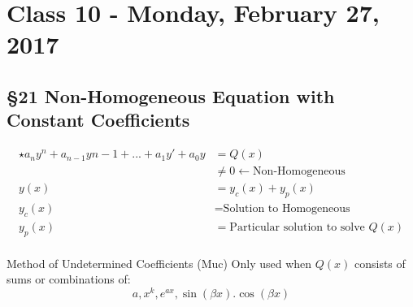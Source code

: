 \chapter{Class 10 - Monday, February 27, 2017}
\section*{\S 21 Non-Homogeneous Equation with Constant Coefficients}
\begin{align*}
    \star a_n y^n+a_{n-1}y{n-1}+\text{...}+a_1y'+a_0 y&=Q(x)\\
    &\neq 0 \leftarrow \text{Non-Homogeneous}\\
    y(x)&=y_c(x)+y_p(x)\\
    y_c(x)&=\text{Solution to Homogeneous}\\
    y_p(x)&=\text{Particular solution to solve } Q(x)\\
\end{align*}
\begin{imp:defn}{Method of Undetermined Coefficients (Muc)}{} Only used when $Q(x)$ consists of sums or combinations of:$$a, x^k,e^{ax},\sin (\beta x). \cos (\beta x)$$
\end{imp:defn}
